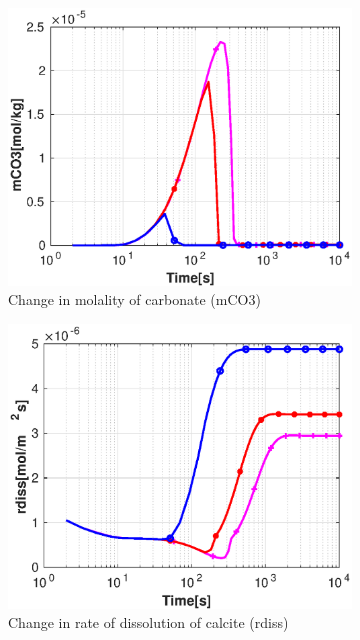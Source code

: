 \begin{figure}[!h]
\begin{subfigure}{.5\linewidth}
        \centering
        \includegraphics[width=\textwidth]{PICTURES/with_vel_mCO3.eps}
        \caption{Change in molality of carbonate (mCO3)}
        \label{fig:velmCO3}
    \end{subfigure}%
    \hfill
    \begin{subfigure}{.5\linewidth}
        \centering
        \includegraphics[width=\textwidth]{PICTURES/with_vel_rdiss.eps}
        \caption{Change in rate of dissolution of calcite (rdiss)}
        \label{fig:velrdiss}
    \end{subfigure}%
    \begin{subfigure}{.5\linewidth}

\end{subfigure}
\end{figure}

